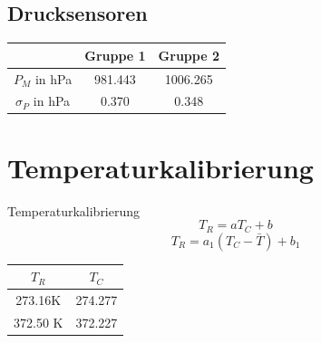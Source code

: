 \documentclass[11pt]{beamer}
\begin{document}
\subsection{Drucksensoren}
\begin{frame}
\begin{figure}[H]
\end{figure}

\begin{table}[H]\centering
\begin{tabular}{c|c|c}
 & Gruppe 1 & Gruppe 2 \\ 
\hline 
$P_M$ in hPa & 981.443 & 1006.265 \\ 
$\sigma_P$ in hPa & 0.370 & 0.348 \\  
\end{tabular} 
\end{table}
\end{frame}
\section{Temperaturkalibrierung}
\begin{frame}{Temperaturkalibrierung}
\begin{equation*}
T_{R}=aT_{C}+b
\end{equation*}
\begin{equation*}
T_{R}=a_1(T_{C}-\bar{T})+b_1
\end{equation*}
\begin{table}[H]\centering
\begin{tabular}{|c|c|}
\hline 
$T_R$ & $T_C$ \\ 
\hline 
273.16K & 274.277 \\ 
\hline
372.50 K & 372.227 \\ 
\hline
\end{tabular}
\end{table}

 
\end{frame}
\end{document}

